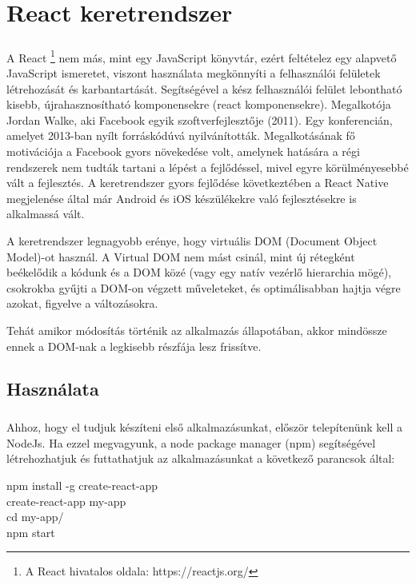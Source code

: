 \chapter{React keretrendszer}\label{ch:progik}

\paragraph{}
A React \footnote{A React hivatalos oldala: https://reactjs.org/} nem más, mint egy JavaScript könyvtár, ezért feltételez egy alapvető JavaScript ismeretet, viszont használata megkönnyíti a felhasználói felületek létrehozását és karbantartását. Segítségével a kész felhasználói felület lebontható kisebb, újrahasznosítható komponensekre (react komponensekre). Megalkotója Jordan Walke, aki Facebook egyik szoftverfejlesztője (2011). Egy konferencián, amelyet 2013-ban nyílt forráskódúvá nyilvánították. Megalkotásának fő motivációja a Facebook gyors növekedése volt, amelynek hatására a régi rendszerek nem tudták tartani a lépést a fejlődéssel, mivel egyre körülményesebbé vált a fejlesztés. A keretrendszer gyors fejlődése következtében a React Native megjelenése által már Android és iOS készülékekre való fejlesztésekre is alkalmassá vált. 

A keretrendszer legnagyobb erénye, hogy virtuális DOM (Document Object Model)-ot használ. A Virtual DOM nem mást csinál, mint új rétegként beékelődik a kódunk és a DOM közé (vagy egy natív vezérlő hierarchia mögé), csokrokba gyűjti a DOM-on végzett műveleteket, és optimálisabban hajtja végre azokat, figyelve a változásokra.

Tehát amikor módosítás történik az alkalmazás állapotában, akkor mindössze ennek a DOM-nak a legkisebb részfája lesz frissítve.

\section{Használata}
\paragraph{}
Ahhoz, hogy el tudjuk készíteni első alkalmazásunkat, először telepítenünk kell a NodeJs. Ha ezzel megvagyunk, a node package manager (npm) segítségével létrehozhatjuk és futtathatjuk az alkalmazásunkat a következő parancsok által:
\begin{center}
npm install -g create-react-app \\
create-react-app my-app  \\
cd my-app/  \\ 
npm start \\
\end{center}

